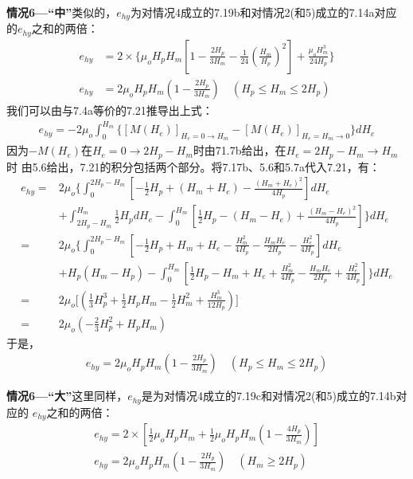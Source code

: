 \textbf{情况6---“中”}\quad 类似的，$e_{hy}$为对情况4成立的7.19b和对情况2(和5)成立的7.14a对应的$e_{hy}$之和的两倍：
\begin{align*}%
e_{hy}&=2\times\{\mu_oH_pH_m\left[1-\frac{2H_p}{3H_m}-\frac{1}{24}\left(\frac{H_m}{H_p}\right)^2\right]+\frac{\mu_oH_{m}^{3}}{24H_p}\}\\
e_{hy}&=2\mu_oH_pH_m\left(1-\frac{2H_p}{3H_m}\right)\quad (H_p\leq H_m\leq 2H_p) \tag{7.20b}
\end{align*}
我们可以由与7.4a等价的7.21推导出上式：
\begin{align*}%
e_{hy}=-2\mu_o\int_{0}^{H_m}\{[M(H_e)]_{H_e=0\rightarrow H_m}-[M(H_e)]_{H_e=H_m\rightarrow 0}\}dH_e \tag{7.21}
\end{align*}
因为$-M(H_e)$在$H_e=0\rightarrow 2H_p-H_m$时由71.7b给出，在$H_e=2H_p-H_m\rightarrow H_m$时
由5.6给出，7.21的积分包括两个部分。将7.17b、5.6和5.7a代入7.21，有：
\begin{align*}%
e_{hy}=&2\mu_o\{\int_{0}^{2H_p-H_m}\left[-\frac{1}{2}H_p+(H_m+H_e)-\frac{(H_m+H_e)^2}{4H_p}\right]dH_e \\
&+\int_{2H_p-H_m}^{H_m}\frac{1}{2}H_pdH_e-\int_{0}^{H_m}\left[\frac{1}{2}H_p-(H_m-H_e)+\frac{(H_m-H_e)^2}{4H_p}\right]\}dH_e\\
=&2\mu_o\{\int_{0}^{2H_p-H_m}\left[-\frac{1}{2}H_p+H_m+H_e-\frac{H_{m}^{2}}{4H_p}-\frac{H_mH_e}{2H_p}-\frac{H_{e}^{2}}{4H_p}\right]dH_e \\
&+H_p(H_m-H_p)-\int_{0}^{H_m}\left[\frac{1}{2}H_p-H_m+H_e+\frac{H_{m}^{2}}{4H_p}-\frac{H_mH_e}{2H_p}+\frac{H_{e}^{2}}{4H_p}\right]\}dH_e \\
=&2\mu_o\big[\left(\frac{1}{3}H_{p}^{3}+\frac{1}{2}H_pH_m-\frac{1}{2}H_{m}^{2}+\frac{H_{m}^{3}}{12H_p}\right)\big] \\
=&2\mu_o\left(-\frac{2}{3}H_{p}^{2}+H_pH_m\right) 
\end{align*}
于是，
\begin{align*}
e_{hy}=2\mu_oH_pH_m\left(1-\frac{2H_p}{3H_m}\right)\quad (H_p\leq H_m\leq 2H_p) \tag{7.20b}
\end{align*}

\textbf{情况6---“大”}\quad 这里同样，$e_{hy}$是为对情况4成立的7.19c和对情况2(和5)成立的7.14b对应的
$e_{hy}$之和的两倍：
\begin{align*}%
e_{hy}=2\times\left[\frac{1}{2}\mu_oH_pH_m+\frac{1}{2}\mu_oH_pH_m\left(1-\frac{4H_p}{3H_m}\right)\right]\\
e_{hy}=2\mu_oH_pH_m\left(1-\frac{2H_p}{3H_m}\right) \quad (H_m\geq 2H_p) \tag{7.20c}
\end{align*}

